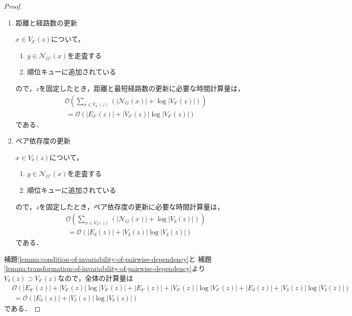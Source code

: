 \begin{proof}
\begin{enumerate}[label=(\alph*)]
  \item 距離と経路数の更新
    \par $x\in V_{\delta'}(z)$について，
    \begin{enumerate}[label=\arabic*.]
    \item $y\in\mathcal{N}_{G'}(x)$を走査する
    \item 順位キューに追加されている
    \end{enumerate}
    ので，$z$を固定したとき，距離と最短経路数の更新に必要な時間計算量は，
    \begin{equation}
      \begin{aligned}
        &\mathcal{O}(\sum_{x\in V_{\delta'}(z)}(\lvert\mathcal{N}_G(x)\rvert
        +\log\lvert V_{\delta'}(z)\rvert)) \nonumber\\
        &\:=\mathcal{O}(\lvert E_{\delta'}(z)\rvert
        +\lvert V_{\delta'}(z)\rvert\log\lvert V_{\delta'}(z)\rvert) \nonumber
      \end{aligned}
    \end{equation}
    である．

  \item ペア依存度の更新
    \par $x\in V_\delta(z)$について，
    \begin{enumerate}[label=\arabic*.]
    \item $y\in\mathcal{N}_{G'}(x)$を走査する
    \item 順位キューに追加されている
    \end{enumerate}
    ので，$z$を固定したとき，ペア依存度の更新に必要な時間計算量は，
    \begin{equation}
      \begin{aligned}
        &\mathcal{O}(\sum_{x\in V_\delta(z)}(\lvert\mathcal{N}_G(x)\rvert
        +\log\lvert V_\delta(z)\rvert)) \nonumber\\
        &\:=\mathcal{O}(\lvert E_\delta(z)\rvert
        +\lvert V_\delta(z)\rvert\log\lvert V_\delta(z)\rvert) \nonumber
      \end{aligned}
    \end{equation}
    である．
  \end{enumerate}
  
  補題\ref{lemma:condition-of-invariability-of-pairwise-dependency}と
  補題\ref{lemma:transformation-of-invariability-of-pairwise-dependency}より
  $V_\delta(z)\supset V_{\delta'}(z)$なので，全体の計算量は
  \begin{equation*}
    \begin{aligned}
      &\mathcal{O}(
        \lvert E_{\delta'}(z)\rvert+\lvert V_{\delta'}(z)\rvert\log\lvert V_{\delta'}(z)\rvert
        +\lvert E_{\delta'}(z)\rvert+\lvert V_{\delta'}(z)\rvert\log\lvert V_{\delta'}(z)\rvert
        +\lvert E_\delta(z)\rvert+\lvert V_\delta(z)\rvert\log\lvert V_\delta(z)\rvert
      ) \nonumber\\
      &\:=\mathcal{O}(\lvert E_\delta(z)\rvert+\lvert V_\delta(z)\rvert\log\lvert V_\delta(z)\rvert)
    \end{aligned}
  \end{equation*}
  である．


\end{proof}
